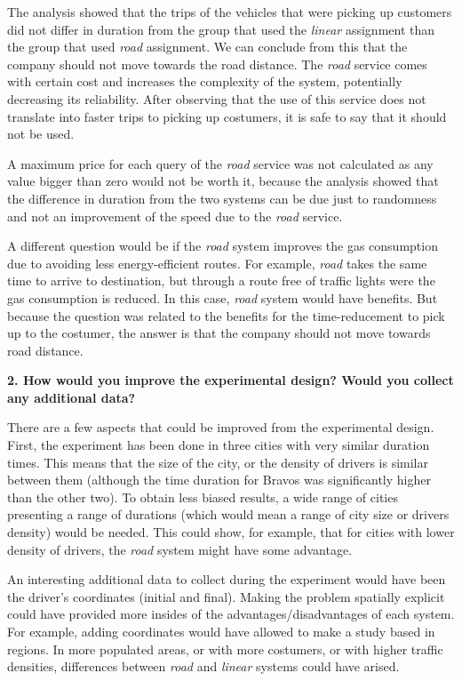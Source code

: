 \documentclass[
]{article}
\begin{document}
The analysis showed that the trips of the vehicles that were picking up
customers did not differ in duration from the group that used the
\emph{linear} assignment than the group that used \emph{road}
assignment. We can conclude from this that the company should not move
towards the road distance. The \emph{road} service comes with certain
cost and increases the complexity of the system, potentially decreasing
its reliability. After observing that the use of this service does not
translate into faster trips to picking up costumers, it is safe to say
that it should not be used.

A maximum price for each query of the \emph{road} service was not
calculated as any value bigger than zero would not be worth it, because
the analysis showed that the difference in duration from the two systems
can be due just to randomness and not an improvement of the speed due to
the \emph{road} service.

A different question would be if the \emph{road} system improves the gas
consumption due to avoiding less energy-efficient routes. For example,
\emph{road} takes the same time to arrive to destination, but through a
route free of traffic lights were the gas consumption is reduced. In
this case, \emph{road} system would have benefits. But because the
question was related to the benefits for the time-reducement to pick up
to the costumer, the answer is that the company should not move towards
road distance.

\textbf{2. How would you improve the experimental design? Would you
collect any additional data?}

There are a few aspects that could be improved from the experimental
design. First, the experiment has been done in three cities with very
similar duration times. This means that the size of the city, or the
density of drivers is similar between them (although the time duration
for Bravos was significantly higher than the other two). To obtain less
biased results, a wide range of cities presenting a range of durations
(which would mean a range of city size or drivers density) would be
needed. This could show, for example, that for cities with lower density
of drivers, the \emph{road} system might have some advantage.

An interesting additional data to collect during the experiment would
have been the driver's coordinates (initial and final). Making the
problem spatially explicit could have provided more insides of the
advantages/disadvantages of each system. For example, adding coordinates
would have allowed to make a study based in regions. In more populated
areas, or with more costumers, or with higher traffic densities,
differences between \emph{road} and \emph{linear} systems could have
arised.
\end{document}
